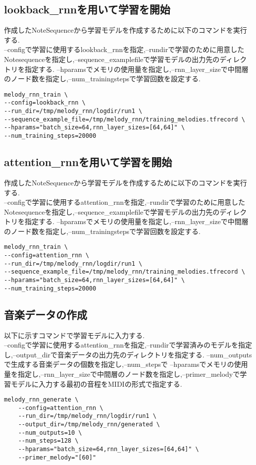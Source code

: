 \subsection{lookback\_rnnを用いて学習を開始}
作成したNoteSequenceから学習モデルを作成するために以下のコマンドを実行する.\\
--configで学習に使用するlookback\_rnnを指定,--rundirで学習のために用意したNotesequenceを指定し,--sequence\_examplefileで学習モデルの出力先のディレクトリを指定する.
--hparamsでメモリの使用量を指定し,--rnn\_layer\_sizeで中間層のノード数を指定し,--num\_trainingstepsで学習回数を設定する.\\
\begin{lstlisting}[basicstyle=\ttfamily\footnotesize,frame=single]
melody_rnn_train \
--config=lookback_rnn \
--run_dir=/tmp/melody_rnn/logdir/run1 \
--sequence_example_file=/tmp/melody_rnn/training_melodies.tfrecord \
--hparams="batch_size=64,rnn_layer_sizes=[64,64]" \
--num_training_steps=20000
\end{lstlisting}
\subsection{attention\_rnnを用いて学習を開始}
作成したNoteSequenceから学習モデルを作成するために以下のコマンドを実行する.\\
--configで学習に使用するattention\_rnnを指定,--rundirで学習のために用意したNotesequenceを指定し,--sequence\_examplefileで学習モデルの出力先のディレクトリを指定する.
--hparamsでメモリの使用量を指定し,--rnn\_layer\_sizeで中間層のノード数を指定し,--num\_trainingstepsで学習回数を設定する.\\
\begin{lstlisting}[basicstyle=\ttfamily\footnotesize,frame=single]
melody_rnn_train \
--config=attention_rnn \
--run_dir=/tmp/melody_rnn/logdir/run1 \
--sequence_example_file=/tmp/melody_rnn/training_melodies.tfrecord \
--hparams="batch_size=64,rnn_layer_sizes=[64,64]" \
--num_training_steps=20000
\end{lstlisting}
\newpage
\subsection{音楽データの作成}
以下に示すコマンドで学習モデルに入力する.\\
--configで学習に使用するattention\_rnnを指定,--rundirで学習済みのモデルを指定し,--output\_dirで音楽データの出力先のディレクトリを指定する.
--num\_outputsで生成する音楽データの個数を指定し,--num\_stepsで
--hparamsでメモリの使用量を指定し,--rnn\_layer\_sizeで中間層のノード数を指定し,--primer\_melodyで学習モデルに入力する最初の音程をMIDIの形式で指定する.\\
\begin{lstlisting}[basicstyle=\ttfamily\footnotesize,frame=single]
    melody_rnn_generate \
    --config=attention_rnn \
    --run_dir=/tmp/melody_rnn/logdir/run1 \
    --output_dir=/tmp/melody_rnn/generated \
    --num_outputs=10 \
    --num_steps=128 \
    --hparams="batch_size=64,rnn_layer_sizes=[64,64]" \
    --primer_melody="[60]"
\end{lstlisting}
